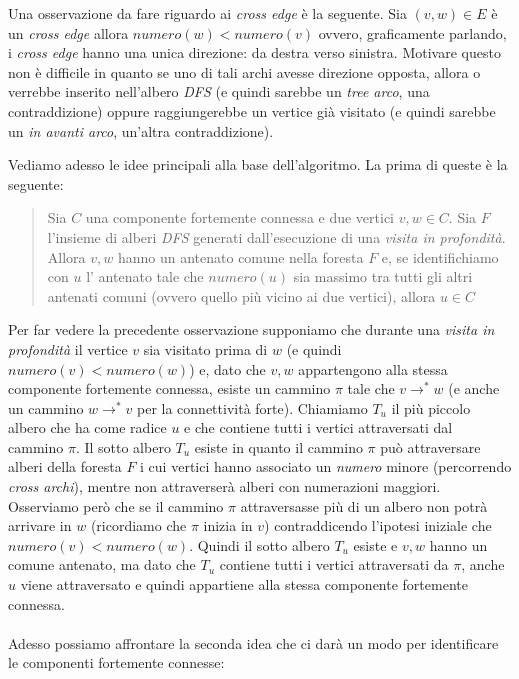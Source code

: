 Una osservazione da fare riguardo ai \emph{cross edge} \`e la
seguente. Sia $(v, w) \in E$ \`e un \emph{cross edge} allora
$numero(w) < numero(v)$ ovvero, graficamente parlando, i \emph{cross
  edge} hanno una unica direzione: da destra verso sinistra. Motivare
questo non \`e difficile in quanto se uno di tali archi avesse
direzione opposta, allora o verrebbe inserito nell'albero \emph{DFS}
(e quindi sarebbe un \emph{tree arco}, una contraddizione) oppure
raggiungerebbe un vertice gi\`a visitato (e quindi sarebbe un
\emph{in avanti arco}, un'altra contraddizione).

Vediamo adesso le idee principali alla base dell'algoritmo. La prima
di queste \`e la seguente:
\begin{quotation}
  Sia $C$ una componente fortemente connessa e due vertici $v, w \in
  C$. Sia $F$ l'insieme di alberi \emph{DFS} generati dall'esecuzione
  di una \emph{visita in profondit\`a}. Allora $v, w$ hanno un antenato
  comune nella foresta $F$ e, se identifichiamo con $u$ l' antenato
  tale che $numero(u)$ sia massimo tra tutti gli altri antenati comuni
  (ovvero quello pi\`u vicino ai due vertici), allora $u \in C$
\end{quotation}
Per far vedere la precedente osservazione supponiamo che durante una
\emph{visita in profondit\`a} il vertice $v$ sia visitato prima di $w$ (e
quindi $numero(v) < numero(w)$) e, dato che $v,w$ appartengono alla
stessa componente fortemente connessa, esiste un cammino $\pi$ tale che
$v \rightarrow^{*} w$ (e anche un cammino $w \rightarrow^{*} v$ per la
connettivit\`a forte). Chiamiamo $T_{u}$ il pi\`u piccolo albero che
ha come radice $u$ e che contiene tutti i vertici attraversati dal
cammino $\pi$. Il sotto albero $T_{u}$ esiste in quanto il cammino
$\pi$ pu\`o attraversare alberi della foresta $F$ i cui vertici hanno
associato un \emph{numero} minore (percorrendo \emph{cross archi}),
mentre non attraverser\`a alberi con numerazioni maggiori. Osserviamo
per\`o che se il cammino $\pi$ attraversasse pi\`u di un albero non
potr\`a arrivare in $w$ (ricordiamo che $\pi$ inizia in $v$)
contraddicendo l'ipotesi iniziale che $numero(v) < numero(w)$. Quindi
il sotto albero $T_{u}$ esiste e $v,w$ hanno un comune antenato, ma
dato che $T_{u}$ contiene tutti i vertici attraversati da $\pi$, anche
$u$ viene attraversato e quindi appartiene alla stessa componente
fortemente connessa.
\\\\
Adesso possiamo affrontare la seconda idea che ci dar\`a un modo per
identificare le componenti fortemente connesse:

